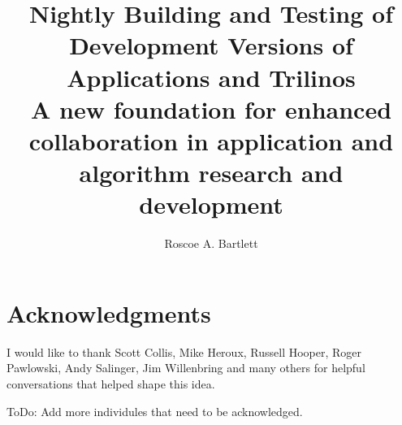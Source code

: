 \documentclass[pdf,ps2pdf,11pt]{SANDreport}
\title{\center
Nightly Building and Testing of Development Versions of Applications and
Trilinos\\[2ex] {\Large A new foundation for enhanced collaboration in
application and algorithm research and development}}
\author{Roscoe A. Bartlett}
\begin{document}
\maketitle

%


%
%


%
%

%
\clearpage
\section*{Acknowledgments}

I would like to thank Scott Collis, Mike Heroux, Russell Hooper, Roger
Pawlowski, Andy Salinger, Jim Willenbring and many others for helpful
conversations that helped shape this idea.

ToDo: Add more individules that need to be acknowledged.

%

%
\clearpage
\tableofcontents

\end{document}
